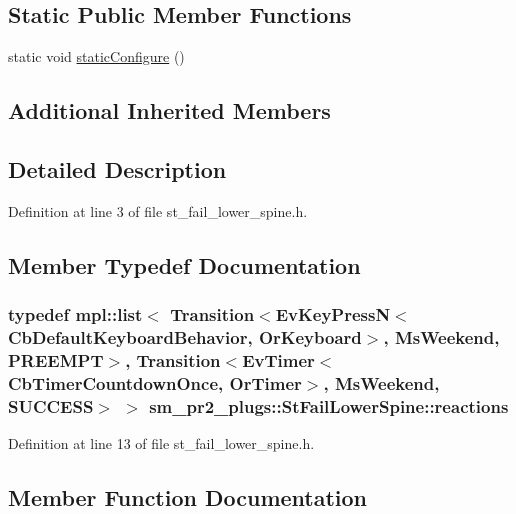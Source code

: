 \subsection*{Static Public Member Functions}
\begin{DoxyCompactItemize}
\item 
static void \hyperlink{structsm__pr2__plugs_1_1StFailLowerSpine_a11a49e55ac8e400fa3587ac15ecfb2a8}{static\+Configure} ()
\end{DoxyCompactItemize}
\subsection*{Additional Inherited Members}


\subsection{Detailed Description}


Definition at line 3 of file st\+\_\+fail\+\_\+lower\+\_\+spine.\+h.



\subsection{Member Typedef Documentation}
\subsubsection[{\texorpdfstring{reactions}{reactions}}]{\setlength{\rightskip}{0pt plus 5cm}typedef mpl\+::list$<$ Transition$<$Ev\+Key\+PressN$<$Cb\+Default\+Keyboard\+Behavior, {\bf Or\+Keyboard}$>$, {\bf Ms\+Weekend}, {\bf P\+R\+E\+E\+M\+PT}$>$, Transition$<$Ev\+Timer$<$Cb\+Timer\+Countdown\+Once, {\bf Or\+Timer}$>$, {\bf Ms\+Weekend}, {\bf S\+U\+C\+C\+E\+SS}$>$ $>$ {\bf sm\+\_\+pr2\+\_\+plugs\+::\+St\+Fail\+Lower\+Spine\+::reactions}}\hypertarget{structsm__pr2__plugs_1_1StFailLowerSpine_ae8fc8574db23666fd11dfac422ad598a}{}\label{structsm__pr2__plugs_1_1StFailLowerSpine_ae8fc8574db23666fd11dfac422ad598a}


Definition at line 13 of file st\+\_\+fail\+\_\+lower\+\_\+spine.\+h.



\subsection{Member Function Documentation}
